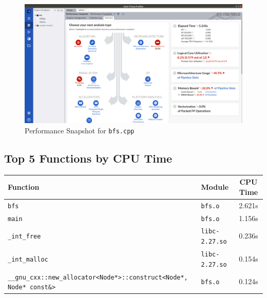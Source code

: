 \documentclass[11pt, swedish, openany]{book}
\begin{document}
\begin{figure}[H]
    \centering
    \includegraphics[scale=0.25]{vtune/bfs/ps.png}
    \caption{Performance Snapshot for \texttt{bfs.cpp}}
\end{figure}

\newpage
\subsection*{Top 5 Functions by CPU Time}
\begin{table}[H]
    \begin{tabular}{||l|l||c||}
        \hline
        Function                                                                      & Module                & CPU Time \\
        \hline
        \texttt{bfs}                                                                  & \texttt{bfs.o}        & 2.621s   \\
        \texttt{main}                                                                 & \texttt{bfs.o}        & 1.156s   \\
        \texttt{\_int\_free}                                                          & \texttt{libc-2.27.so} & 0.236s   \\
        \texttt{\_int\_malloc}                                                        & \texttt{libc-2.27.so} & 0.154s   \\
        \texttt{\_\_gnu\_cxx::new\_allocator<Node*>::construct<Node*, Node* const\&>} & \texttt{bfs.o}        & 0.124s   \\
        \hline
    \end{tabular}
\end{table}
\end{document}
